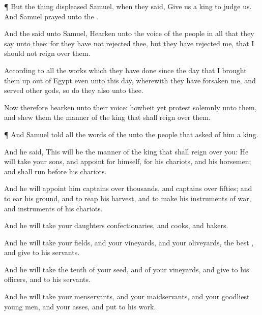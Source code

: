 {\par }{\PP {}¶ But the
thing
displeased
Samuel, when they
said,
Give us a
king to
judge us. And
Samuel
prayed unto the
{}.

And the
{}
said unto
Samuel,
Hearken unto the
voice of the
people in all that they
say unto thee: for they have not
rejected thee, but they have
rejected me, that I should not
reign over them.

According to all the
works which they have
done since the
day that I brought them
up out of
Egypt even unto this
day, wherewith they have
forsaken me, and
served
other
gods, so
do they also unto thee.

Now therefore
hearken unto their
voice:
howbeit yet
protest
solemnly unto them, and
shew them the
manner of the
king that shall
reign over them.


\par }{\PP {}¶ And
Samuel
told all the
words of the
{} unto the
people that
asked of him a
king.

And he
said, This will be the
manner of the
king that shall
reign over you: He will
take your
sons, and
appoint
{} for himself, for his
chariots, and
{} his
horsemen; and
{} shall
run
before his
chariots.

And he will
appoint him
captains over
thousands, and
captains over
fifties; and
{} to
ear his
ground, and to
reap his
harvest, and to
make his
instruments of
war, and
instruments of his
chariots.

And he will
take your
daughters
{}
confectionaries, and
{}
cooks, and
{}
bakers.

And he will
take your
fields, and your
vineyards, and your
oliveyards,
{} the
best
{}, and
give
{} to his
servants.

And he will take the
tenth of your
seed, and of your
vineyards, and
give to his
officers, and to his
servants.

And he will
take your
menservants, and your
maidservants, and your
goodliest young
men, and your
asses, and
put
{} to his
work.

}
